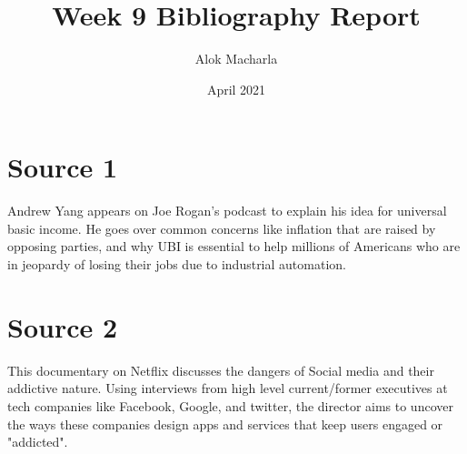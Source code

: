 \documentclass{article}
\title{Week 9 Bibliography Report}
\author{Alok Macharla}
\date{April 2021}
\begin{document}
\maketitle

\section{Source 1}
Andrew Yang appears on Joe Rogan's podcast to explain his idea for universal basic income. He goes over common concerns like inflation that are raised by opposing parties, and why UBI is essential to help millions of Americans who are in jeopardy of losing their jobs due to industrial automation.\cite{rogan_2019}

\section{Source 2}
This documentary on Netflix discusses the dangers of Social media and their addictive nature. Using interviews from high level current/former executives at tech companies like Facebook, Google, and twitter, the director aims to uncover the ways these companies design apps and services that keep users engaged or "addicted".\cite{the_social_dilemma_2020}



\end{document}
